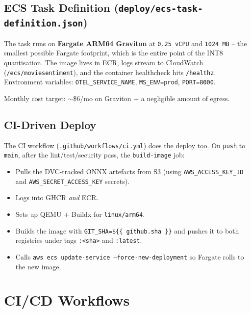 \documentclass[11pt,a4paper]{article}
\begin{document}
\subsection{ECS Task Definition (\texttt{deploy/ecs-task-definition.json})}

The task runs on \textbf{Fargate ARM64 Graviton} at \texttt{0.25 vCPU} and
\texttt{1024 MB} -- the smallest possible Fargate footprint, which is the entire
point of the INT8 quantisation. The image lives in ECR, logs stream to
CloudWatch (\texttt{/ecs/moviesentiment}), and the container healthcheck hits
\texttt{/healthz}. Environment variables: \texttt{OTEL\_SERVICE\_NAME},
\texttt{MS\_ENV=prod}, \texttt{PORT=8000}.

Monthly cost target: $\sim$\$6/mo on Graviton + a negligible amount of egress.

\subsection{CI-Driven Deploy}

The CI workflow (\texttt{.github/workflows/ci.yml}) does the deploy too. On
\texttt{push} to \texttt{main}, after the lint/test/security pass, the
\texttt{build-image} job:

\begin{itemize}[leftmargin=*]
\item Pulls the DVC-tracked ONNX artefacts from S3 (using \texttt{AWS\_ACCESS\_KEY\_ID}
      and \texttt{AWS\_SECRET\_ACCESS\_KEY} secrets).
\item Logs into GHCR \emph{and} ECR.
\item Sets up QEMU + Buildx for \texttt{linux/arm64}.
\item Builds the image with \texttt{GIT\_SHA=\$\{\{ github.sha \}\}} and pushes it to
      both registries under tags \texttt{:<sha>} and \texttt{:latest}.
\item Calls \texttt{aws ecs update-service --force-new-deployment} so Fargate rolls
      to the new image.
\end{itemize}

\section{CI/CD Workflows}
\end{document}
